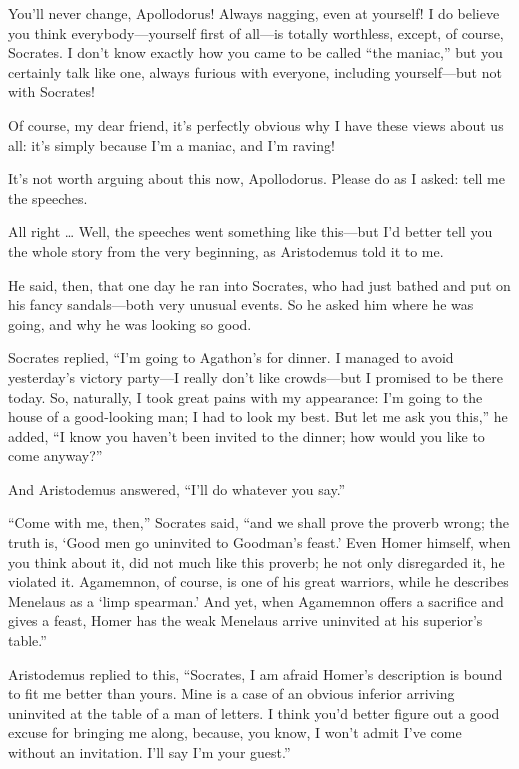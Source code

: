 \sayfriend You’ll never change, Apollodorus! Always nagging, even at
yourself! I do believe you think everybody---yourself first of all---is
totally worthless, except, of course, Socrates. I don’t know exactly how
you came to be called “the maniac,” but you certainly talk like one,
always furious with everyone, including yourself---but not with
Socrates!

\sayapollodorus Of course, my dear friend, it’s perfectly obvious why I 
have these views about us all: it’s simply because I’m a maniac,
and I’m raving!

\sayfriend It’s not worth arguing about this now, Apollodorus. Please do as
I asked: tell me the speeches.

\sayapollodorus All right \ldots{} Well, the speeches went something like
this---but I’d better tell you the whole story from the very beginning,
as Aristodemus told it to me.

He said, then, that one day he ran into Socrates, who had just bathed
and put on his fancy sandals---both very unusual events. So he asked him
where he was going, and why he was looking so good.

Socrates replied, “I’m going to Agathon’s for dinner. I managed to avoid
yesterday’s victory party---I really don’t like crowds---but I promised
to be there today. So, naturally, I took great pains with my appearance:
I’m going to the house of a good-looking man; I had to look my best. But
let me ask you this,” he added, “I know you haven’t been invited to the
dinner; how would you like to come anyway?”

And Aristodemus answered, “I’ll do whatever you say.”

“Come with me, then,” Socrates said, “and we shall prove the proverb
wrong; the truth is, ‘Good men go uninvited to Goodman’s
feast.’ Even Homer
himself, when you think about it, did not much like this proverb;
he not only disregarded it, he violated it. Agamemnon, of
course, is one of his great warriors, while he describes Menelaus as a
‘limp spearman.’ And yet, when Agamemnon offers a sacrifice and gives a
feast, Homer has the weak Menelaus arrive uninvited at his superior’s
table.”

Aristodemus replied to this, “Socrates, I am afraid Homer’s description
is bound to fit me better than yours. Mine is a case of an obvious
inferior arriving uninvited at the table of a man of letters. I think
you’d better figure out a good excuse for bringing me along, because,
you know, I  won’t admit I’ve come without an invitation. I’ll
say I’m your guest.”

